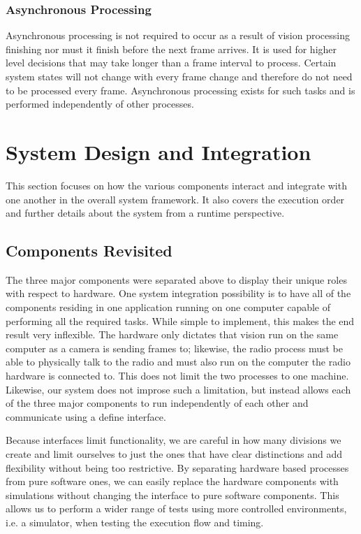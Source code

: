 \documentclass[letterpaper]{llncs}
\begin{document}
\subsubsection{Asynchronous Processing}
Asynchronous processing is not required to occur as a result of vision processing finishing nor must it finish before the next frame arrives. It is used for higher level decisions that may take longer than a frame interval to process. Certain system states will not change with every frame change and therefore do not need to be processed every frame. Asynchronous processing exists for such tasks and is performed independently of other processes.

\section{System Design and Integration}
This section focuses on how the various components interact and integrate with one another in the overall system framework. It also covers the execution order and further details about the system from a runtime perspective.

\subsection{Components Revisited}
The three major components were separated above to display their unique roles with respect to hardware. One system integration possibility is to have all of the components residing in one application running on one computer capable of performing all the required tasks. While simple to implement, this makes the end result very inflexible. The hardware only dictates that vision run on the same computer as a camera is sending frames to; likewise, the radio process must be able to physically talk to the radio and must also run on the computer the radio hardware is connected to. This does not limit the two processes to one machine. Likewise, our system does not improse such a limitation, but instead allows each of the three major components to run independently of each other and communicate using a define interface.

Because interfaces limit functionality, we are careful in how many divisions we create and limit ourselves to just the ones that have clear distinctions and add flexibility without being too restrictive. By separating hardware based processes from pure software ones, we can easily replace the hardware components with simulations without changing the interface to pure software components. This allows us to perform a wider range of tests using more controlled environments, i.e. a simulator, when testing the execution flow and timing.
\end{document}
